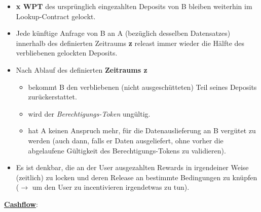 \begin{Solution}
\begin{itemize}
  \item \textbf{x WPT} des ursprünglich eingezahlten Deposits von B bleiben weiterhin im Lookup-Contract gelockt. 
  \item Jede künftige Anfrage von B an A (bezüglich desselben Datensatzes) innerhalb des definierten Zeitraums \textbf{z} releast immer wieder die Hälfte des verbliebenen gelockten Deposits.
  \item Nach Ablauf des definierten \textbf{Zeitraums z}
  \begin{itemize}
  	\item bekommt B den verbliebenen (nicht ausgeschütteten) Teil seines Deposits zurückerstattet.
  	\item wird der \textit{Berechtigungs-Token} ungültig.
  	\item hat A keinen Anspruch mehr, für die Datenauslieferung an B vergütet zu werden (auch dann, falls er Daten ausgeliefert, ohne vorher die abgelaufene Gültigkeit des Berechtigungs-Tokens zu validieren).
  \end{itemize}
  \item Es ist denkbar, die an der User ausgezahlten Rewards in irgendeiner Weise (zeitlich) zu locken und deren Release an bestimmte Bedingungen zu knüpfen ($\rightarrow$ um den User zu incentivieren irgendetwas zu tun).
\end{itemize}

\vspace{0.5cm}

\underline{\textbf{Cashflow}}:


\end{Solution}

